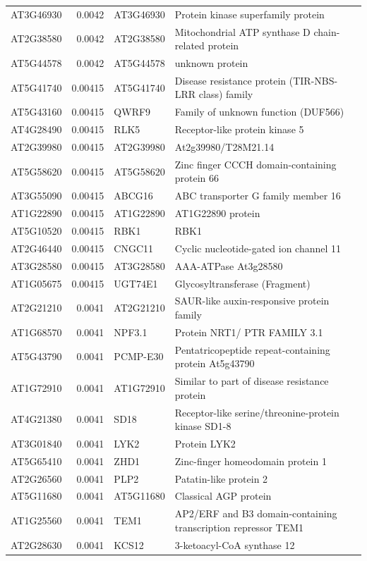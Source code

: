 \documentclass[11pt]{article}
\begin{document}
\begin{center}
\begin{tabular}{lrll}
AT3G46930 & 0.0042 & AT3G46930 & Protein kinase superfamily protein\\
AT2G38580 & 0.0042 & AT2G38580 & Mitochondrial ATP synthase D chain-related protein\\
AT5G44578 & 0.0042 & AT5G44578 & unknown protein\\
AT5G41740 & 0.00415 & AT5G41740 & Disease resistance protein (TIR-NBS-LRR class) family\\
AT5G43160 & 0.00415 & QWRF9 & Family of unknown function (DUF566)\\
AT4G28490 & 0.00415 & RLK5 & Receptor-like protein kinase 5\\
AT2G39980 & 0.00415 & AT2G39980 & At2g39980/T28M21.14\\
AT5G58620 & 0.00415 & AT5G58620 & Zinc finger CCCH domain-containing protein 66\\
AT3G55090 & 0.00415 & ABCG16 & ABC transporter G family member 16\\
AT1G22890 & 0.00415 & AT1G22890 & AT1G22890 protein\\
AT5G10520 & 0.00415 & RBK1 & RBK1\\
AT2G46440 & 0.00415 & CNGC11 & Cyclic nucleotide-gated ion channel 11\\
AT3G28580 & 0.00415 & AT3G28580 & AAA-ATPase At3g28580\\
AT1G05675 & 0.00415 & UGT74E1 & Glycosyltransferase (Fragment)\\
AT2G21210 & 0.0041 & AT2G21210 & SAUR-like auxin-responsive protein family\\
AT1G68570 & 0.0041 & NPF3.1 & Protein NRT1/ PTR FAMILY 3.1\\
AT5G43790 & 0.0041 & PCMP-E30 & Pentatricopeptide repeat-containing protein At5g43790\\
AT1G72910 & 0.0041 & AT1G72910 & Similar to part of disease resistance protein\\
AT4G21380 & 0.0041 & SD18 & Receptor-like serine/threonine-protein kinase SD1-8\\
AT3G01840 & 0.0041 & LYK2 & Protein LYK2\\
AT5G65410 & 0.0041 & ZHD1 & Zinc-finger homeodomain protein 1\\
AT2G26560 & 0.0041 & PLP2 & Patatin-like protein 2\\
AT5G11680 & 0.0041 & AT5G11680 & Classical AGP protein\\
AT1G25560 & 0.0041 & TEM1 & AP2/ERF and B3 domain-containing transcription repressor TEM1\\
AT2G28630 & 0.0041 & KCS12 & 3-ketoacyl-CoA synthase 12\\

\end{tabular}
\end{center}
\end{document}
